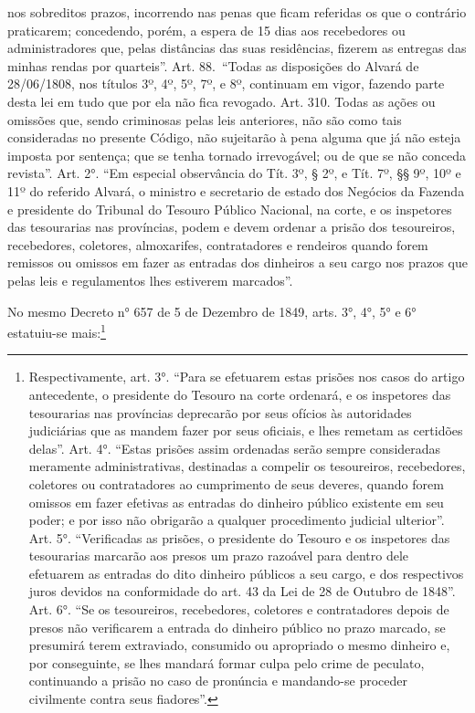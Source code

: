 {  nos sobreditos prazos, incorrendo nas penas que ficam referidas os que
  o contrário praticarem; concedendo, porém, a espera de 15 dias aos
  recebedores ou administradores que, pelas distâncias das suas
  residências, fizerem as entregas das minhas rendas por quarteis''.
  Art. 88.~``Todas as disposições do Alvará de 28/06/1808, nos títulos
  3º, 4º, 5º, 7º, e 8º, continuam em vigor, fazendo parte desta lei em
  tudo que por ela não fica revogado. Art. 310. Todas as ações ou
  omissões que, sendo criminosas pelas leis anteriores, não são como
  tais consideradas no presente Código, não sujeitarão à pena alguma que
  já não esteja imposta por sentença; que se tenha tornado irrevogável;
  ou de que se não conceda revista''. Art. 2°. ``Em especial observância
  do Tít. 3º, § 2º, e Tít. 7º, §§ 9º, 10º e 11º do referido Alvará, o
  ministro e secretario de estado dos Negócios da Fazenda e presidente
  do Tribunal do Tesouro Público Nacional, na corte, e os inspetores das
  tesourarias nas províncias, podem e devem ordenar a prisão dos
  tesoureiros, recebedores, coletores, almoxarifes, contratadores e
  rendeiros quando forem remissos ou omissos em fazer as entradas dos
  dinheiros a seu cargo nos prazos que pelas leis e regulamentos lhes
  estiverem marcados''.}

No mesmo Decreto n° 657 de 5 de Dezembro de 1849, arts. 3°, 4°, 5° e 6°
estatuiu-se mais:\footnote{Respectivamente, art. 3°. ``Para se efetuarem
  estas prisões nos casos do artigo antecedente, o presidente do Tesouro
  na corte ordenará, e os inspetores das tesourarias nas províncias
  deprecarão por seus ofícios às autoridades judiciárias que as mandem
  fazer por seus oficiais, e lhes remetam as certidões delas''. Art. 4°.
  ``Estas prisões assim ordenadas serão sempre consideradas meramente
  administrativas, destinadas a compelir os tesoureiros, recebedores,
  coletores ou contratadores ao cumprimento de seus deveres, quando
  forem omissos em fazer efetivas as entradas do dinheiro público
  existente em seu poder; e por isso não obrigarão a qualquer
  procedimento judicial ulterior''. Art. 5°. ``Verificadas as prisões, o
  presidente do Tesouro e os inspetores das tesourarias marcarão aos
  presos um prazo razoável para dentro dele efetuarem as entradas do
  dito dinheiro públicos a seu cargo, e dos respectivos juros devidos na
  conformidade do art. 43 da Lei de 28 de Outubro de 1848''. Art. 6°.
  ``Se os tesoureiros, recebedores, coletores e contratadores depois de
  presos não verificarem a entrada do dinheiro público no prazo marcado,
  se presumirá terem extraviado, consumido ou apropriado o mesmo
  dinheiro e, por conseguinte, se lhes mandará formar culpa pelo crime
  de peculato, continuando a prisão no caso de pronúncia e mandando-se
  proceder civilmente contra seus fiadores''.}

